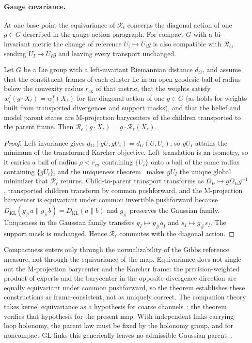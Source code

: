 \paragraph{Gauge covariance.}
At one base point the equivariance of $\mathcal{R}_\ell$ concerns the diagonal action of one $g\in G$ described in the gauge-action paragraph. For compact $G$ with a bi-invariant metric the change of reference $U_i\mapsto U_ig$ is also compatible with $\mathcal{R}_\ell$, sending $U_I\mapsto U_Ig$ and leaving every transport unchanged.

\begin{theorem}
\label{thm:rg_covariance}
Let $G$ be a Lie group with a left-invariant Riemannian distance $d_G$, and assume that the constituent frames of each cluster lie in an open geodesic ball of radius below the convexity radius $r_{\mathrm{cx}}$ of that metric, that the weights satisfy $w_i^I(g \cdot X_\ell) = w_i^I(X_\ell)$ for the diagonal action of one $g\in G$ (as holds for weights built from transported divergences and support masks), and that the belief and model parent states are M-projection barycenters of the children transported to the parent frame. Then $\mathcal{R}_\ell(g \cdot X_\ell) = g \cdot \mathcal{R}_\ell(X_\ell)$.
\end{theorem}

\begin{proof}
Left invariance gives $d_G(gU, gU_i) = d_G(U, U_i)$, so $gU_I$ attains the minimum of the transformed Karcher objective. Left translation is an isometry, so it carries a ball of radius $\rho<r_{\mathrm{cx}}$ containing $\{U_i\}$ onto a ball of the same radius containing $\{gU_i\}$, and the uniqueness theorem~\cite[Thm.~2.1]{Afsari2011} makes $gU_I$ the unique global minimizer that $\mathcal{R}_\ell$ returns. Child-to-parent transport transforms as $\Omega_{Ii} \mapsto g\Omega_{Ii}g^{-1}$, transported children transform by common pushforward, and the M-projection barycenter is equivariant under common invertible pushforward because $D_{\mathrm{KL}}(g_\# a \| g_\# b) = D_{\mathrm{KL}}(a \| b)$ and $g_\#$ preserves the Gaussian family. Uniqueness in the Gaussian family transfers $q_I \mapsto g_\# q_I$ and $s_I \mapsto g_\# s_I$. The support mask is unchanged. Hence $\mathcal{R}_\ell$ commutes with the diagonal action.
\end{proof}

Compactness enters only through the normalizability of the Gibbs reference measure, not through the equivariance of the map. Equivariance does not single out the M-projection barycenter and the Karcher frame: the precision-weighted product of experts and the barycenter in the opposite divergence direction are equally equivariant under common pushforward, so the theorem establishes these constructions as frame-consistent, not as uniquely correct. The companion theory takes kernel equivariance as a hypothesis for coarse channels~\cite[Ch.~9]{DennisGaugeVFE2026}; the theorem verifies that hypothesis for the present map. With independent links carrying loop holonomy, the parent law must be fixed by the holonomy group, and for noncompact $\mathrm{GL}$ links this generically leaves no admissible Gaussian parent~\cite[Ch.~10]{DennisGaugeVFE2026}.

